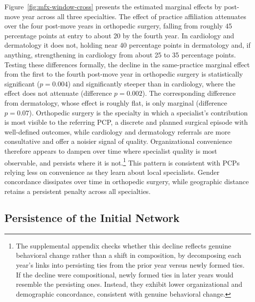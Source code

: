 \documentclass[12pt]{article}
\begin{document}
Figure~\ref{fig:mfx-window-cross} presents the estimated marginal effects by post-move year across all three specialties. The effect of practice affiliation attenuates over the four post-move years in orthopedic surgery, falling from roughly 45 percentage points at entry to about 20 by the fourth year. In cardiology and dermatology it does not, holding near 40 percentage points in dermatology and, if anything, strengthening in cardiology from about 25 to 35 percentage points. Testing these differences formally, the decline in the same-practice marginal effect from the first to the fourth post-move year in orthopedic surgery is statistically significant ($p = 0.004$) and significantly steeper than in cardiology, where the effect does not attenuate (difference $p = 0.002$). The corresponding difference from dermatology, whose effect is roughly flat, is only marginal (difference $p = 0.07$). Orthopedic surgery is the specialty in which a specialist's contribution is most visible to the referring PCP, a discrete and planned surgical episode with well-defined outcomes, while cardiology and dermatology referrals are more consultative and offer a noisier signal of quality. Organizational convenience therefore appears to dampen over time where specialist quality is most observable, and persists where it is not.\footnote{The supplemental appendix checks whether this decline reflects genuine behavioral change rather than a shift in composition, by decomposing each year's links into persisting ties from the prior year versus newly formed ties. If the decline were compositional, newly formed ties in later years would resemble the persisting ones. Instead, they exhibit lower organizational and demographic concordance, consistent with genuine behavioral change.} This pattern is consistent with PCPs relying less on convenience as they learn about local specialists. Gender concordance dissipates over time in orthopedic surgery, while geographic distance retains a persistent penalty across all specialties.

\subsection{Persistence of the Initial Network}
\end{document}
